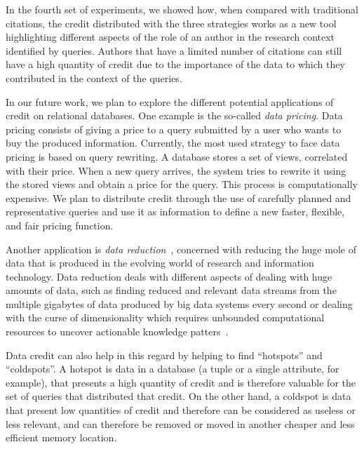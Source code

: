 In the fourth set of experiments, we showed how, when compared with traditional citations, the credit distributed with the three strategies works as a new tool highlighting different aspects of the role of an author in the research context identified by queries. Authors that have a limited number of citations can still have a high quantity of credit due to the importance of the data to which they contributed in the context of the queries. 

In our future work, we plan to explore the different potential applications of credit on relational databases.
One example is the so-called \emph{data pricing}. Data pricing consists of giving a price to a query submitted by a user who wants to buy the produced information. Currently, the most used strategy to face data pricing is based on query rewriting. A database stores a set of views, correlated with their price. When a new query arrives, the system tries to rewrite it using the stored views and obtain a price for the query. This process is computationally expensive.
We plan to distribute credit through the use of carefully planned and representative queries and use it as information to define a new faster, flexible, and fair pricing function.

Another application is \emph{data reduction}~\cite{milo2019getting}, concerned with reducing the huge mole of data that is produced in the evolving world of research and information technology. Data reduction deals with different aspects of dealing with huge amounts of data, such as finding reduced and relevant data streams from the multiple gigabytes of data produced by big data systems every second or dealing with the curse of dimensionality which requires unbounded computational resources to uncover actionable knowledge patters~\citep{ur2016big}.

Data credit can also help in this regard by helping to find ``hotspots'' and ``coldspots''. A hotspot is data in a database (a tuple or a single attribute, for example), that presents a high quantity of credit and is therefore valuable for the set of queries that distributed that credit. 
On the other hand, a coldspot is data that present low quantities of credit and therefore can be considered as useless or less relevant, and can therefore be removed or moved in another cheaper and less efficient memory location. 
